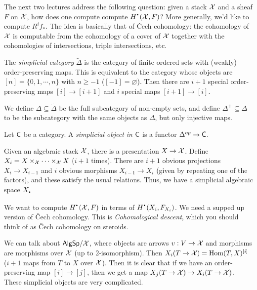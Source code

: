 
The next two lectures address the following question: given a stack $\mathcal{X}$ and a sheaf $F$ on $\mathcal{X}$, how does one compute compute $H^\udot(\X,F)$? More generally, we'd like to compute $R^i\!f_*$. The idea is basically that of \v Cech cohomology: the cohomology of $\mathcal{X}$ is computable from the cohomology of a cover of $\mathcal{X}$ together with the cohomologies of intersections, triple intersections, etc.

\begin{definition}
  The \emph{simplicial category} $\tilde \Delta$ is the category of finite ordered sets with (weakly) order-preserving maps. This is equivalent to the category whose objects are $[n]=\{0, 1, \cdots, n\}$ with $n\ge -1$ ($[-1]=\varnothing$). Then there are $i+1$ special order-preserving maps $[i]\to [i+1]$ and $i$ special maps $[i+1]\to [i]$. 
  
  We define $\Delta\subseteq \tilde \Delta$ be the full subcategory of non-empty sets, and define $\Delta^+\subseteq \Delta$ to be the subcategory with the same objects as $\Delta$, but only injective maps.

  Let $\text{\sf C}$ be a category. A \emph{simplicial object in $\text{\sf C}$} is a functor $\Delta^{op}\to \text{\sf C}$.
\end{definition}
Given an algebraic stack $\mathcal{X}$, there is a presentation $X\to \mathcal{X}$. Define $X_i=X\times_{\mathcal{X}}\cdots \times_{\mathcal{X}} X$ ($i+1$ times). There are $i+1$ obvious projections $X_i\to X_{i-1}$ and $i$ obvious morphisms $X_{i-1}\to X_{i}$ (given by repeating one of the factors), and these satisfy the usual relations. Thus, we have a simplicial algebraic space $X_\udot$

We want to compute $H^\udot(\X,F)$ in terms of $H^\udot(X_i,F_{X_i})$. We need a supped up version of \v{C}ech cohomology. This is \emph{Cohomological descent}, which you should think of as \v{C}ech cohomology on steroids.

We can talk about $\text{\sf AlgSp}/\mathcal{X}$, where objects are arrows $v:V\to \mathcal{X}$ and morphisms are morphisms over $\mathcal{X}$ (up to 2-isomorphism). Then $X_i(T\to \mathcal{X})=\operatorname{Hom}(T,X)^{[i]}$ ($i+1$ maps from $T$ to $X$ over $\mathcal{X}$). Then it is clear that if we have an order-preserving map $[i]\to[j]$, then we get a map $X_j(T\to \mathcal{X})\to X_i(T\to \mathcal{X})$. These simplicial objects are very complicated.

